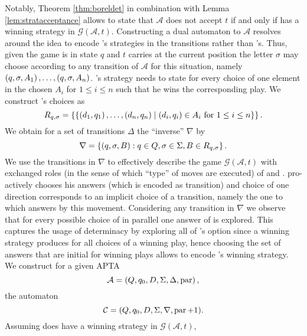 Notably, Theorem \ref{thm:boreldet} in combination with Lemma
\ref{lem:stratacceptance} allows to state that $\mathcal{A}$ does not accept
$t$ if and only if \adam{} has a winning strategy in
$\mathcal{G}(\mathcal{A},t)$. Constructing a dual automaton to $\mathcal{A}$
resolves around the idea to encode \adam{}'s strategies in the transitions 
rather than \eve{}'s. Thus, given the game is in state $q$ and $t$ carries at 
the current position the letter $\sigma$ \eve{} may choose according to any 
transition of $\mathcal{A}$ for this situation, namely 
$\left(q,\sigma,A_{1}\right),\dots,\left(q,\sigma,A_{n}\right)$. 
\adam{}'s strategy needs to state for every choice of \eve{} one element in the 
chosen $A_{i}$ for $1\leq i\leq n$ such that he wins the corresponding play. We
construct \adam{}'s choices as
\begin{equation*}
  R_{q,\sigma} = \left\{
    \left\{
      \left(d_{1}, q_{1}\right),\dots,\left(d_{n},q_{n}\right)\mid
      \left(d_{i}, q_{i}\right)\in A_{i}\text{ for }1\leq i\leq n
    \right\}
  \right\}.
\end{equation*}
We obtain for a set of transitions $\Delta$ the \enquote{inverse} $\nabla$ by
\begin{equation*}
  \nabla = \left\{
    \left(q, \sigma, B\right):q\in Q, \sigma\in\Sigma, B\in R_{q,\sigma}
  \right\}.
\end{equation*}
We use the transitions in $\nabla$ to effectively describe the game 
$\mathcal{G}(\mathcal{A}, t)$ with exchanged roles (in the sense of which 
\enquote{type} of moves are executed) of \eve{} and \adam{}. \adam{} 
pro-actively chooses his answers (which is encoded as transition) and \eve{} 
choice of one direction corresponds to an implicit choice of a transition, 
namely the one to which \adam{} answers by this movement. Considering any 
transition in $\nabla$ we observe that for every possible choice of \eve{} 
in parallel one answer of \adam{} is explored. This captures the usage of
determinacy by exploring all of \adam{}'s option since a winning strategy 
produces for all choices of \eve{} a winning play, hence choosing the set of 
answers that are initial for winning plays allows to encode \adam{}'s winning
strategy. We construct for a given 
\ac{APTA}
\begin{equation*}
  \mathcal{A} = \left(Q, q_{0}, D, \Sigma, \Delta, \operatorname{par}\right),
\end{equation*}
the automaton
\begin{equation*}
  \mathcal{C} = (Q, q_{0}, D, \Sigma, \nabla, \operatorname{par} + 1).
\end{equation*}
Assuming \adam{} does have a winning strategy in $\mathcal{G}(\mathcal{A}, t)$, 
